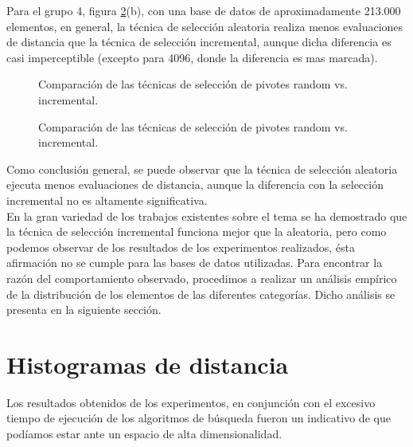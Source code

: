 Para el grupo 4, figura \ref{fig:ETS-2}(b), con una base de datos de aproximadamente 213.000 elementos, en general, la t\'ecnica de selecci\'on aleatoria realiza menos evaluaciones de distancia que la t\'ecnica de selecci\'on incremental, aunque dicha diferencia es casi imperceptible (excepto para 4096, donde la diferencia es mas marcada).\\


\begin{figure}[tb]
\centering
{}
\caption{\small Comparaci\'on de las t\'ecnicas de selecci\'on de pivotes random vs. incremental.}
\label{fig:ETS-1}
\end{figure}
\begin{figure}[tb]
\centering
{}
\caption{\small Comparaci\'on de las t\'ecnicas de selecci\'on de pivotes random vs. incremental.}
\label{fig:ETS-2}

\end{figure}

Como conclusi\'on general, se puede observar que la t\'ecnica de selecci\'on aleatoria ejecuta menos evaluaciones de distancia, aunque la diferencia con la selecci\'on incremental no es altamente significativa.\\

En la gran variedad de los trabajos existentes sobre el tema se ha demostrado que la t\'ecnica de selecci\'on incremental funciona mejor que la aleatoria, pero como podemos observar de los resultados de los experimentos realizados, \'esta afirmaci\'on no se cumple para las bases de datos utilizadas. Para encontrar la raz\'on del comportamiento observado, procedimos a realizar un an\'alisis emp\'irico de la distribuci\'on de los elementos de las diferentes categor\'ias. Dicho an\'alisis se presenta en la siguiente secci\'on.


\section{Histogramas de distancia}
 
Los resultados obtenidos de los experimentos, en conjunci\'on con el excesivo tiempo de ejecuci\'on de los algoritmos de b\'usqueda fueron un indicativo de que pod\'iamos estar ante un espacio de alta dimensionalidad.\\

